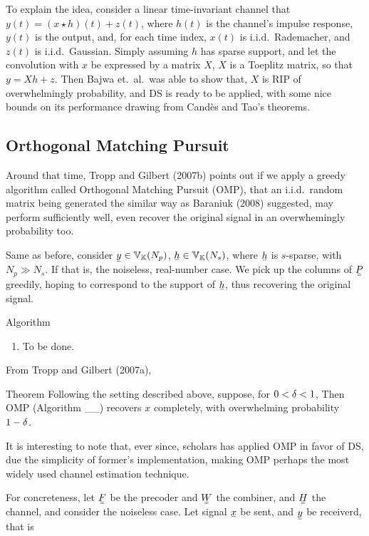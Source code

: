 To explain the idea, consider a linear time-invariant channel that \(y(t) =(x \star h)(t) + z(t)\), where \(h(t)\) is the channel's impulse response, \(y(t)\) is the output, and, for each time index, \(x(t)\) is i.i.d.\ Rademacher, and \(z(t)\) is i.i.d.\ Gaussian.
Simply assuming \(h\) has sparse support, and let the convolution with \(x\) be expressed by a matrix \(X\), \(X\) is a Toeplitz matrix, so that \(y =X h +z\).
Then Bajwa et.\ al.\ was able to show that, \(X\) is RIP of overwhelmingly probability, and DS is ready to be applied, with some nice bounds on its performance drawing from Cand\`es and Tao's theorems.

\subsection{Orthogonal Matching Pursuit}

Around that time, Tropp and Gilbert (2007b) points out if we apply a greedy algorithm called Orthogonal Matching Pursuit (OMP), that an i.i.d.\ random matrix being generated the similar way as Baraniuk (2008) suggested, may perform sufficiently well, even recover the original signal in an overwhemingly probability too.

Same as before, consider \(\V{y} \in \MB{V}_\MB{K} (N_p)\), \(\V{h} \in \MB{V}_\MB{K} (N_s)\), where \(\V{h}\) is \(s\)-sparse, with \(N_p \gg N_s\).
If
that is, the noiseless, real-number case.
We pick up the columns of \(\M{P}\) greedily, hoping to correspond to the support of \(\V{h}\), thus recovering the original signal.

\Result
{Algorithm}
{
\begin{enumerate}
\item To be done.
\end{enumerate}
}

From Tropp and Gilbert (2007a),

\Result
{Theorem}
{
Following the setting described above, suppose, for \(0 <\delta <1\),
%
%
Then OMP (Algorithm \_\_) recovers \(x\) completely, with overwhelming probability \(1-\delta\).
}

It is interesting to note that, ever since, scholars has applied OMP in favor of DS, due the simplicity of former's implementation, making OMP perhaps the most widely used channel estimation technique.

For concreteness, let \(\M{F}\) be the precoder and \(\M{W}\) the combiner, and \(\M{H}\) the channel, and consider the noiseless case.
Let signal \(\V{x}\) be sent, and \(\V{y}\) be receiverd, that is
%
%

